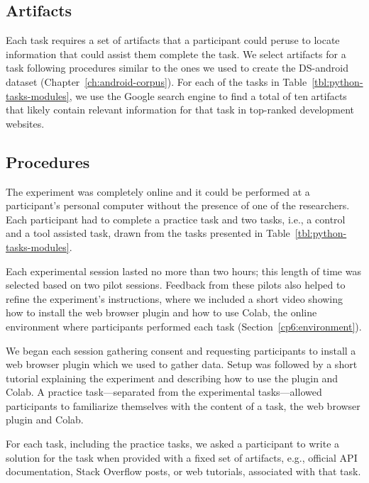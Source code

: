 {\subsection{Artifacts}
\label{sec:experiment-artifacts}


Each task requires a set of artifacts that a participant could peruse to locate information that could assist them complete the task.
We select artifacts for a task following procedures similar to the ones we used to create the \acs{DS-android} dataset (Chapter~\ref{ch:android-corpus}). 
For each of the tasks in Table~\ref{tbl:python-tasks-modules}, we use the Google search engine to find a total of ten artifacts that likely contain relevant
information for that task in top-ranked development websites. 






\subsection{Procedures}
\label{cp6:evaluation-procedures}



The experiment was completely online and it could be performed at a participant's personal computer
without the presence of one of the researchers. Each participant had to complete a practice task and two tasks, i.e., a control and a tool assisted task, drawn from the tasks presented in Table~\ref{tbl:python-tasks-modules}. 


Each experimental session lasted no more than two hours; this length of time was selected based on two pilot sessions. 
Feedback from these pilots also helped to refine the experiment's instructions, where we included a short video showing how to install the web browser plugin and how to use Colab, the online environment where participants performed each task (Section~\ref{cp6:environment}).






We began each session gathering consent and requesting participants to install a web browser plugin which we used to gather data.
Setup was followed by a short tutorial explaining the experiment and describing how to use the plugin and Colab. 
A practice task---separated from the experimental tasks---allowed participants to familiarize themselves with the content of a task, the web browser plugin and Colab. 



For each task, including the practice tasks, we asked a participant to write a solution for the task
when provided with a fixed set of artifacts, e.g., official API documentation, Stack Overflow posts, or web tutorials, 
associated with that task.  


}
